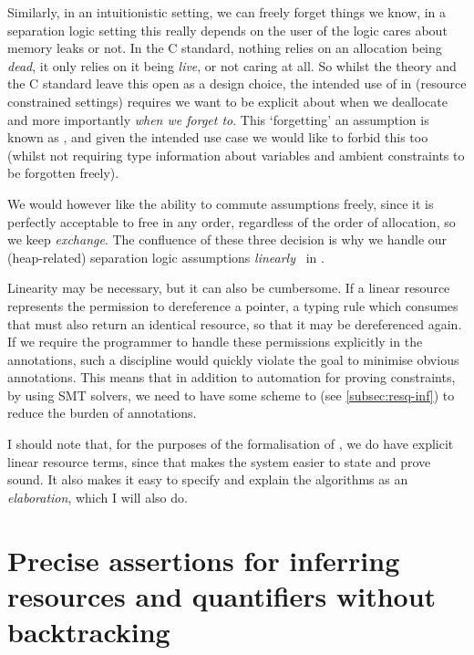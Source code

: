 Similarly, in an intuitionistic setting, we can freely forget things we know,
in a separation logic setting this really depends on the user of the logic
cares about memory leaks or not. In the C standard, nothing relies on an
allocation being \emph{dead}, it only relies on it being \emph{live}, or not
caring at all. So whilst the theory and the C standard leave this open as a
design choice, the intended use of  in (resource constrained settings)
requires we want to be explicit about when we deallocate and more importantly
\emph{when we forget to}. This `forgetting'
an assumption is known as , and given the intended use case we
would like to forbid this too (whilst not requiring type information about
variables and ambient constraints to be forgotten freely).

We would however like the ability to commute assumptions freely, since it is
perfectly acceptable to free in any order, regardless of the order of
allocation, so we keep \emph{exchange}. The confluence of these three decision
is why we handle our (heap-related) separation logic assumptions
\emph{linearly}~ in .

Linearity may be necessary, but it can also be cumbersome. If a linear resource
represents the permission to dereference a pointer, a typing rule which
consumes that must also return an identical resource, so that it may be
dereferenced again. If we require the programmer to handle these permissions
explicitly in the annotations, such a discipline would quickly violate the goal
to minimise obvious annotations. This means that in addition to automation for
proving constraints, by using SMT solvers, we need to have some scheme to
 (see \cref{subsec:resq-inf}) to
reduce the burden of annotations.

I should note that, for the purposes of the formalisation of , we
do have explicit linear resource terms, since that makes the system easier to
state and prove sound. It also makes it easy to specify and explain the 
 algorithms as an \emph{elaboration}, which I will also
do.

\section{Precise assertions for inferring resources and quantifiers without backtracking}

